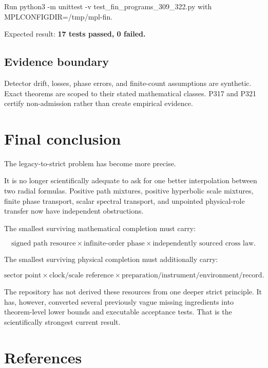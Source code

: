 \documentclass[11pt,a4paper,openany]{report}
\begin{document}
Run python3 -m unittest -v test\_fin\_programs\_309\_322.py with MPLCONFIGDIR=/\allowbreak{}tmp/\allowbreak{}mpl-fin.

Expected result: \textbf{17 tests passed, 0 failed.}

\section{Evidence boundary}

Detector drift, losses, phase errors, and finite-count assumptions are synthetic. Exact theorems are scoped to their stated mathematical classes. P317 and P321 certify non-admission rather than create empirical evidence.

\chapter{Final conclusion}

The legacy-to-strict problem has become more precise.

It is no longer scientifically adequate to ask for one better interpolation between two radial formulas. Positive path mixtures, positive hyperbolic scale mixtures, finite phase transport, scalar spectral transport, and unpointed physical-role transfer now have independent obstructions.

The smallest surviving mathematical completion must carry:

\[
\boxed{
\text{signed path resource}
\times
\text{infinite-order phase}
\times
\text{independently sourced cross law}
}.
\]

The smallest surviving physical completion must additionally carry:

\[
\boxed{
\text{sector point}
\times
\text{clock/scale reference}
\times
\text{preparation/instrument/environment/record}
}.
\]

The repository has not derived these resources from one deeper strict principle. It has, however, converted several previously vague missing ingredients into theorem-level lower bounds and executable acceptance tests. That is the scientifically strongest current result.

\chapter{References}
\end{document}
